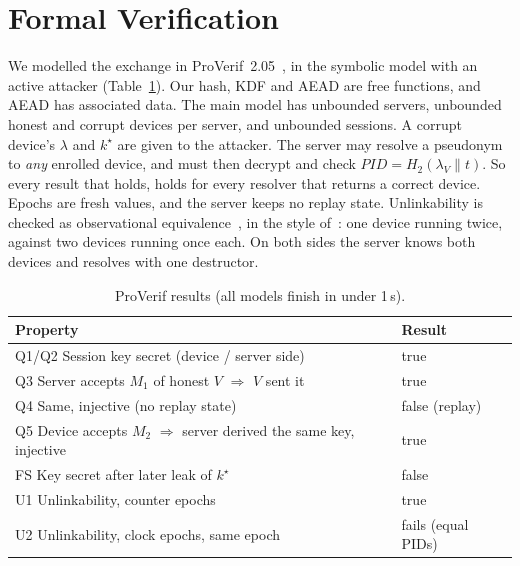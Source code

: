 \section{Formal Verification}\label{sec:fv}
We modelled the exchange in ProVerif~2.05~\cite{proverif}, in the symbolic model with an active attacker
(Table~\ref{tab:fv}). Our hash, KDF and AEAD are free functions, and AEAD has associated data. The main model has
unbounded servers, unbounded honest and corrupt devices per server, and unbounded sessions. A corrupt device's $\lambda$
and $k^\star$ are given to the attacker. The server may resolve a pseudonym to \emph{any} enrolled device, and must then
decrypt and check $PID=H_2(\lambda_V\|t)$. So every result that holds, holds for every resolver that returns a correct
device. Epochs are fresh values, and the server keeps no replay state. Unlinkability is checked as observational
equivalence~\cite{blanchet08}, in the style of~\cite{arapinis}: one device running twice, against two devices running
once each. On both sides the server knows both devices and resolves with one destructor.

\begin{table}[t]
\centering
\caption{ProVerif results (all models finish in under 1\,s).}
\label{tab:fv}
\scriptsize
\begin{tabular}{@{}p{7.6cm}l@{}}
\toprule
Property & Result \\
\midrule
Q1/Q2 Session key secret (device / server side) & true \\
Q3 Server accepts $M_1$ of honest $V$ $\Rightarrow$ $V$ sent it & true \\
Q4 Same, injective (no replay state) & false (replay) \\
Q5 Device accepts $M_2$ $\Rightarrow$ server derived the same key, injective & true \\
FS Key secret after later leak of $k^\star$ & false \\
U1 Unlinkability, counter epochs & true \\
U2 Unlinkability, clock epochs, same epoch & fails (equal PIDs) \\
\bottomrule
\end{tabular}
\end{table}

